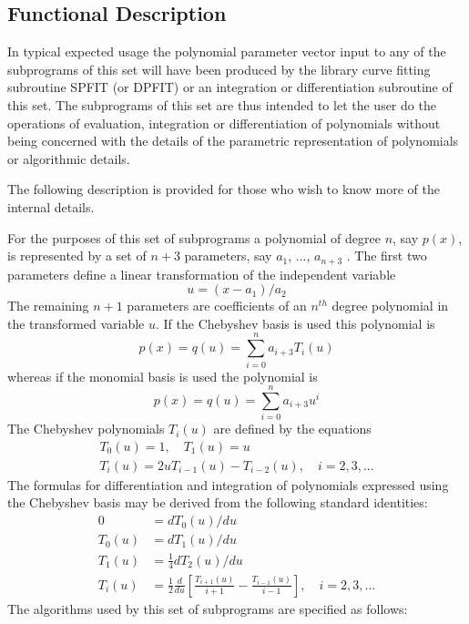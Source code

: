 \documentclass[twoside]{MATH77}
\begin{document}
\subsection{Functional Description}

In typical expected usage the polynomial parameter vector input to any of
the subprograms of this set will have been produced by the library curve
fitting subroutine SPFIT (or DPFIT) or an integration or differentiation
subroutine of this set. The subprograms of this set are thus intended to
let the user do the operations of evaluation, integration or differentiation
of polynomials without being concerned with the details of the parametric
representation of polynomials or algorithmic details.

The following description is provided for those who wish to know more of the
internal details.

For the purposes of this set of subprograms a polynomial of degree $n$, say $%
p(x)$, is represented by a set of $n+3$ parameters, say $a_1$, ..., $a_{n+3}$%
. The first two parameters define a linear transformation of the independent
variable
\begin{equation*}
u=(x-a_1)/a_2
\end{equation*}
The remaining $n+1$ parameters are coefficients of an $n^{th}$ degree
polynomial in the transformed variable $u$. If the Chebyshev basis is used
this polynomial is%
\begin{equation*}
p(x)=q(u)=\sum_{i=0}^na_{i+3}T_i(u)
\end{equation*}
whereas if the monomial basis is used the polynomial is%
\begin{equation*}
p(x)=q(u)=\sum_{i=0}^na_{i+3}u^i
\end{equation*}
The Chebyshev polynomials $T_i(u)$ are defined by the equations%
\begin{gather*}
T_0(u)=1,\quad T_1(u)=u\\
T_i(u)=2uT_{i-1}(u)-T_{i-2}(u),\quad i=2,3,...
\end{gather*}
The formulas for differentiation and integration of polynomials expressed
using the Chebyshev basis may be derived from the following standard
identities:
\begin{align*}
0&=dT_0(u)/du\\
T_0(u)&=dT_1(u)/du\\
T_1(u)&=\frac 14 dT_2(u)/du\\
T_i(u)&=\frac 12\frac d{du}\left[ \frac{T_{i+1}(u)}{i+1}-
\frac{T_{i-1}(u)}{i-1}\right] ,\quad i=2,3,...
\end{align*}
The algorithms used by this set of subprograms are specified as follows:
\end{document}
